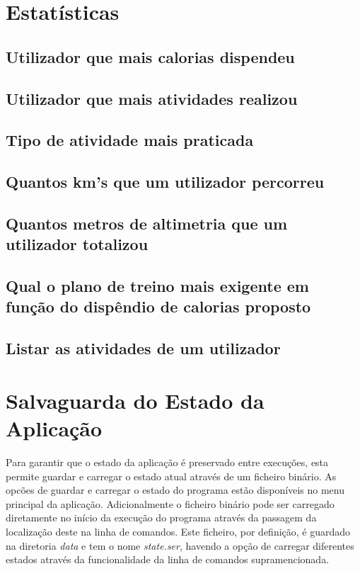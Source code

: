 \documentclass[a4paper,12pt]{scrreprt}
\begin{document}
\clearpage
\section{Estatísticas}
    \label{sec:estatisticas}
    \subsection{Utilizador que mais calorias dispendeu}
    \subsection{Utilizador que mais atividades realizou}
    \subsection{Tipo de atividade mais praticada}
    \subsection{Quantos km's que um utilizador percorreu}
    \subsection{Quantos metros de altimetria que um utilizador totalizou}
    \subsection{Qual o plano de treino mais exigente em função do dispêndio de calorias proposto}
    \subsection{Listar as atividades de um utilizador}

\clearpage
\section{Salvaguarda do Estado da Aplicação}
    \label{sec:salvaguarda-estado}
Para garantir que o estado da aplicação é preservado entre execuções, esta
permite guardar e carregar o estado atual através de um ficheiro binário.
As opcões de guardar e carregar o estado do programa estão disponíveis no menu principal da aplicação. Adicionalmente o ficheiro binário pode ser carregado diretamente no início da execução do programa através da passagem da localização deste na linha de comandos.
Este ficheiro, por definição, é guardado na diretoria \textit{data} e tem o nome \textit{state.ser}, havendo a opção de carregar diferentes estados através da funcionalidade da linha de comandos supramencionada.
\end{document}
